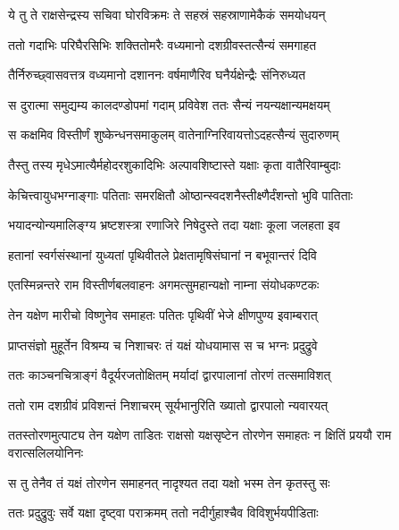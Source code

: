 \twolineshloka
{ये तु ते राक्षसेन्द्रस्य सचिवा घोरविक्रमः}
{ते सहस्रं सहस्राणामेकैकं समयोधयन्} %

\twolineshloka
{ततो गदाभिः परिघैरसिभिः शक्तितोमरैः}
{वध्यमानो दशग्रीवस्तत्सैन्यं समगाहत} %

\twolineshloka
{तैर्निरुच्छ्वासवत्तत्र वध्यमानो दशाननः}
{वर्षमाणैरिव घनैर्यक्षेन्द्रैः संनिरुध्यत} %

\twolineshloka
{स दुरात्मा समुद्यम्य कालदण्डोपमां गदाम्}
{प्रविवेश ततः सैन्यं नयन्यक्षान्यमक्षयम्} %

\twolineshloka
{स कक्षमिव विस्तीर्णं शुष्केन्धनसमाकुलम्}
{वातेनाग्निरिवायत्तोऽदहत्सैन्यं सुदारुणम्} %

\twolineshloka
{तैस्तु तस्य मृधेऽमात्यैर्महोदरशुकादिभिः}
{अल्पावशिष्टास्ते यक्षाः कृता वातैरिवाम्बुदाः} %

\twolineshloka
{केचित्त्वायुधभग्नाङ्गाः पतिताः समरक्षितौ}
{ओष्ठान्स्वदशनैस्तीक्ष्णैर्दंशन्तो भुवि पातिताः} %

\twolineshloka
{भयादन्योन्यमालिङ्ग्य भ्रष्टशस्त्रा रणाजिरे}
{निषेदुस्ते तदा यक्षाः कूला जलहता इव} %

\twolineshloka
{हतानां स्वर्गसंस्थानां युध्यतां पृथिवीतले}
{प्रेक्षतामृषिसंघानां न बभूवान्तरं दिवि} %

\twolineshloka
{एतस्मिन्नन्तरे राम विस्तीर्णबलवाहनः}
{अगमत्सुमहान्यक्षो नाम्ना संयोधकण्टकः} %

\twolineshloka
{तेन यक्षेण मारीचो विष्णुनेव समाहतः}
{पतितः पृथिवीं भेजे क्षीणपुण्य इवाम्बरात्} %

\twolineshloka
{प्राप्तसंज्ञो मुहूर्तेन विश्रम्य च निशाचरः}
{तं यक्षं योधयामास स च भग्नः प्रदुद्रुवे} %

\twolineshloka
{ततः काञ्चनचित्राङ्गं वैदूर्यरजतोक्षितम्}
{मर्यादां द्वारपालानां तोरणं तत्समाविशत्} %

\twolineshloka
{ततो राम दशग्रीवं प्रविशन्तं निशाचरम्}
{सूर्यभानुरिति ख्यातो द्वारपालो न्यवारयत्} %

\threelineshloka
{ततस्तोरणमुत्पाट्य तेन यक्षेण ताडितः}
{राक्षसो यक्षसृष्टेन तोरणेन समाहतः}
{न क्षितिं प्रययौ राम वरात्सलिलयोनिनः} %

\twolineshloka
{स तु तेनैव तं यक्षं तोरणेन समाहनत्}
{नादृश्यत तदा यक्षो भस्म तेन कृतस्तु सः} %

\twolineshloka
{ततः प्रदुद्रुवुः सर्वे यक्षा दृष्ट्वा पराक्रमम्}
{ततो नदीर्गुहाश्चैव विविशुर्भयपीडिताः} %


